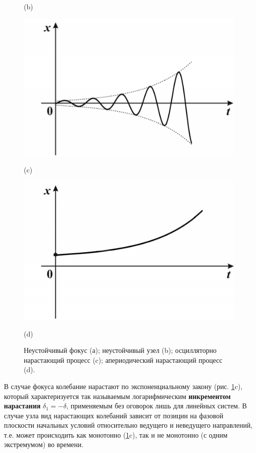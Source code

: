 \begin{figure}[h]
\begin{minipage}{0.45\linewidth}
                (b)      
        \end{minipage}
        \vfill
        \begin{minipage}{0.45\linewidth}
                \centering  
                \includegraphics[]{fig/lect5/6c}

                (c)
        \end{minipage}
        \hfill
        \begin{minipage}{0.45\linewidth}
                \centering  
                \includegraphics[]{fig/lect5/6d}

                (d)      
        \end{minipage}
        \caption{Неустойчивый фокус (а); неустойчивый узел (b); осцилляторно нарастающий процесс (c); апериодический нарастающий процесс (d).}
        \label{fig:5.6}
\end{figure}
В случае фокуса колебание
нарастают по экспоненциальному закону (рис. \ref{fig:5.6}c), который характеризуется
так называемым логарифмическим \textbf{инкрементом нарастания}
$\delta_1= -\delta$,
применяемым без оговорок лишь для линейных систем. В случае узла вид
нарастающих колебаний зависит от позиции на фазовой плоскости начальных
условий относительно ведущего и неведущего направлений, т.е. может
происходить как монотонно (\ref{fig:5.6}c), так и не монотонно (с одним
экстремумом) во времени.

